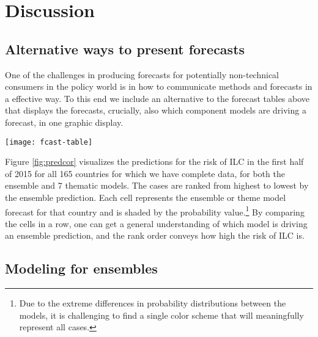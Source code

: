 \documentclass[pdftex,11pt]{article}
\begin{document}

\section{Discussion}

\subsection{Alternative ways to present forecasts}

One of the challenges in producing forecasts for potentially non-technical consumers in the policy world is in how to communicate methods and forecasts in a effective way. To this end we include an alternative to the forecast tables above that displays the forecasts, crucially, also which component models are driving a forecast, in one graphic display. 

\begin{figure*}
  \centering
  \caption{Graphic forecast table}
  \label{fig:predcor}
  \texttt{[image: fcast-table]}
\end{figure*}

Figure \ref{fig:predcor} visualizes the predictions for the risk of ILC in the first half of 2015 for all 165 countries for which we have complete data, for both the ensemble and 7 thematic models. The cases are ranked from highest to lowest by the ensemble prediction. Each cell represents the ensemble or theme model forecast for that country and is shaded by the probability value.\footnote{Due to the extreme differences in probability distributions between the models, it is challenging to find a single color scheme that will meaningfully represent all cases.} By comparing the cells in a row, one can get a general understanding of which model is driving an ensemble prediction, and the rank order conveys how high the risk of ILC is.

\subsection{Modeling for ensembles}
\end{document}

